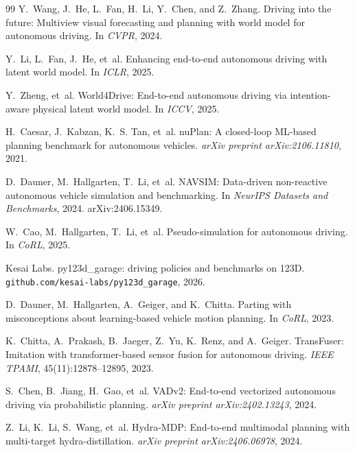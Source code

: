 \documentclass[addpoints]{exam}
\begin{document}
\begin{thebibliography}{99}
    Y.~Wang, J.~He, L.~Fan, H.~Li, Y.~Chen, and Z.~Zhang.
    \newblock Driving into the future: Multiview visual forecasting and planning
    with world model for autonomous driving.
    \newblock In \emph{CVPR}, 2024.

    Y.~Li, L.~Fan, J.~He, et~al.
    \newblock Enhancing end-to-end autonomous driving with latent world model.
    \newblock In \emph{ICLR}, 2025.

    Y.~Zheng, et~al.
    \newblock World4Drive: End-to-end autonomous driving via intention-aware
    physical latent world model.
    \newblock In \emph{ICCV}, 2025.

    H.~Caesar, J.~Kabzan, K.~S. Tan, et~al.
    \newblock nuPlan: A closed-loop ML-based planning benchmark for autonomous
    vehicles.
    \newblock \emph{arXiv preprint arXiv:2106.11810}, 2021.

    D.~Dauner, M.~Hallgarten, T.~Li, et~al.
    \newblock NAVSIM: Data-driven non-reactive autonomous vehicle simulation and
    benchmarking.
    \newblock In \emph{NeurIPS Datasets and Benchmarks}, 2024. arXiv:2406.15349.

    W.~Cao, M.~Hallgarten, T.~Li, et~al.
    \newblock Pseudo-simulation for autonomous driving.
    \newblock In \emph{CoRL}, 2025.

    Kesai Labs.
    \newblock py123d\_garage: driving policies and benchmarks on 123D.
    \newblock \texttt{github.com/kesai-labs/py123d\_garage}, 2026.

    D.~Dauner, M.~Hallgarten, A.~Geiger, and K.~Chitta.
    \newblock Parting with misconceptions about learning-based vehicle motion
    planning.
    \newblock In \emph{CoRL}, 2023.

    K.~Chitta, A.~Prakash, B.~Jaeger, Z.~Yu, K.~Renz, and A.~Geiger.
    \newblock TransFuser: Imitation with transformer-based sensor fusion for
    autonomous driving.
    \newblock \emph{IEEE TPAMI}, 45(11):12878--12895, 2023.

    S.~Chen, B.~Jiang, H.~Gao, et~al.
    \newblock VADv2: End-to-end vectorized autonomous driving via probabilistic
    planning.
    \newblock \emph{arXiv preprint arXiv:2402.13243}, 2024.

    Z.~Li, K.~Li, S.~Wang, et~al.
    \newblock Hydra-MDP: End-to-end multimodal planning with multi-target
    hydra-distillation.
    \newblock \emph{arXiv preprint arXiv:2406.06978}, 2024.


\end{thebibliography}
\end{document}

